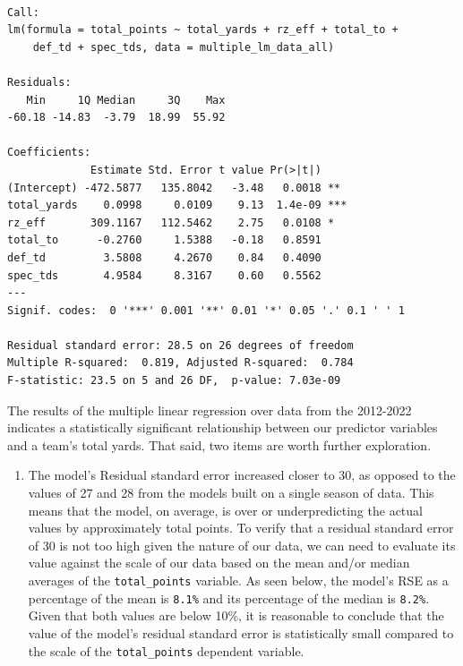 \documentclass[
  letterpaper,
]{krantz}
\providecommand{\tightlist}{%
  \setlength{\itemsep}{0pt}\setlength{\parskip}{0pt}}\usepackage{longtable,booktabs,array}
\begin{document}
\begin{verbatim}

Call:
lm(formula = total_points ~ total_yards + rz_eff + total_to + 
    def_td + spec_tds, data = multiple_lm_data_all)

Residuals:
   Min     1Q Median     3Q    Max 
-60.18 -14.83  -3.79  18.99  55.92 

Coefficients:
             Estimate Std. Error t value Pr(>|t|)    
(Intercept) -472.5877   135.8042   -3.48   0.0018 ** 
total_yards    0.0998     0.0109    9.13  1.4e-09 ***
rz_eff       309.1167   112.5462    2.75   0.0108 *  
total_to      -0.2760     1.5388   -0.18   0.8591    
def_td         3.5808     4.2670    0.84   0.4090    
spec_tds       4.9584     8.3167    0.60   0.5562    
---
Signif. codes:  0 '***' 0.001 '**' 0.01 '*' 0.05 '.' 0.1 ' ' 1

Residual standard error: 28.5 on 26 degrees of freedom
Multiple R-squared:  0.819, Adjusted R-squared:  0.784 
F-statistic: 23.5 on 5 and 26 DF,  p-value: 7.03e-09
\end{verbatim}

The results of the multiple linear regression over data from the
2012-2022 indicates a statistically significant relationship between our
predictor variables and a team's total yards. That said, two items are
worth further exploration.

\begin{enumerate}
\def\labelenumi{\arabic{enumi}.}
\tightlist
\item
  The model's Residual standard error increased closer to 30, as opposed
  to the values of 27 and 28 from the models built on a single season of
  data. This means that the model, on average, is over or
  underpredicting the actual values by approximately total points. To
  verify that a residual standard error of 30 is not too high given the
  nature of our data, we can need to evaluate its value against the
  scale of our data based on the mean and/or median averages of the
  \texttt{total\_points} variable. As seen below, the model's RSE as a
  percentage of the mean is \texttt{8.1\%} and its percentage of the
  median is \texttt{8.2\%}. Given that both values are below 10\%, it is
  reasonable to conclude that the value of the model's residual standard
  error is statistically small compared to the scale of the
  \texttt{total\_points} dependent variable.
\end{enumerate}
\end{document}
